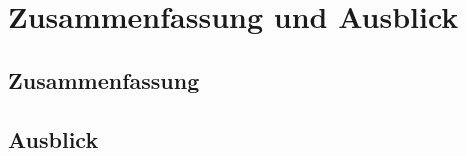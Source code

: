 \documentclass[fontsize=12pt,paper=a4,twoside=semi,parskip=half-,headsepline,headinclude]{scrreprt}
\begin{document}
\chapter{Zusammenfassung und Ausblick}

\section{Zusammenfassung}

\section{Ausblick}



\printbibliography


%
%
%
%
%
%
%
\end{document}
